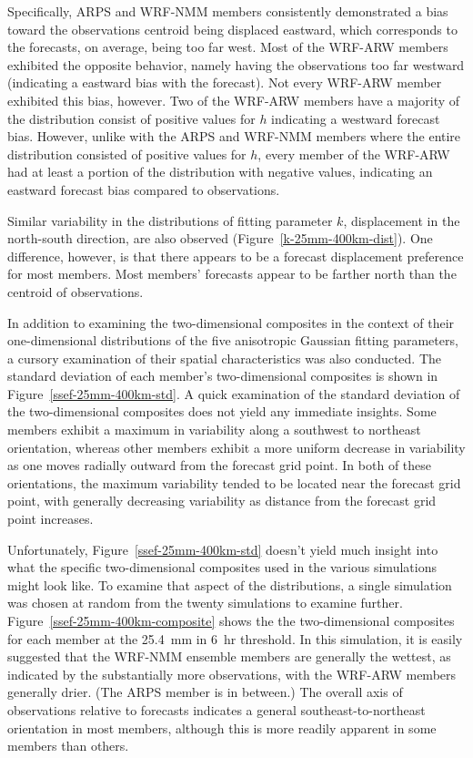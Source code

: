 Specifically, ARPS and WRF-NMM members consistently demonstrated a bias toward the observations centroid being displaced eastward, which corresponds to the forecasts, on average, being too far west.
Most of the WRF-ARW members exhibited the opposite behavior, namely having the observations too far westward (indicating a eastward bias with the forecast).
Not every WRF-ARW member exhibited this bias, however.
Two of the WRF-ARW members have a majority of the distribution consist of positive values for $h$ indicating a westward forecast bias.
However, unlike with the ARPS and WRF-NMM members where the entire distribution consisted of positive values for $h$, every member of the WRF-ARW had at least a portion of the distribution with negative values, indicating an eastward forecast bias compared to observations.


Similar variability in the distributions of fitting parameter $k$, displacement in the north-south direction, are also observed (\mbox{Figure \ref{k-25mm-400km-dist}}).
One difference, however, is that there appears to be a forecast displacement preference for most members.
Most members' forecasts appear to be farther north than the centroid of observations.


In addition to examining the two-dimensional composites in the context of their one-dimensional distributions of the five anisotropic Gaussian fitting parameters, a cursory examination of their spatial characteristics was also conducted.
The standard deviation of each member's two-dimensional composites is shown in \mbox{Figure \ref{ssef-25mm-400km-std}}.
A quick examination of the standard deviation of the two-dimensional composites does not yield any immediate insights.
Some members exhibit a maximum in variability along a southwest to northeast orientation, whereas other members exhibit a more uniform decrease in variability as one moves radially outward from the forecast grid point.
In both of these orientations, the maximum variability tended to be located near the forecast grid point, with generally decreasing variability as distance from the forecast grid point increases.


Unfortunately, \mbox{Figure \ref{ssef-25mm-400km-std}} doesn't yield much insight into what the specific two-dimensional composites used in the various simulations might look like.
To examine that aspect of the distributions, a single simulation was chosen at random from the twenty simulations to examine further.
\mbox{Figure \ref{ssef-25mm-400km-composite}} shows the the two-dimensional composites for each member at the \mbox{25.4 mm} in \mbox{6 hr} threshold.
In this simulation, it is easily suggested that the WRF-NMM ensemble members are generally the wettest, as indicated by the substantially more observations, with the WRF-ARW members generally drier.
(The ARPS member is in between.)
The overall axis of observations relative to forecasts indicates a general southeast-to-northeast orientation in most members, although this is more readily apparent in some members than others.



